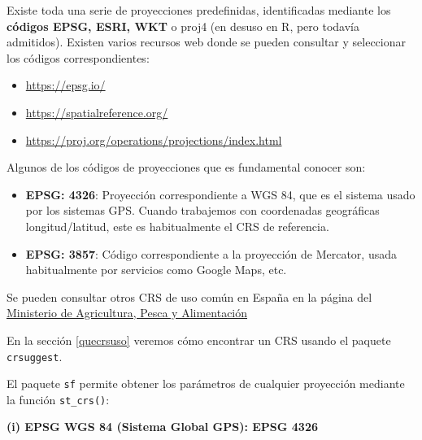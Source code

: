 \documentclass[
]{report}
\begin{document}
Existe toda una serie de proyecciones predefinidas, identificadas mediante los
\textbf{códigos EPSG, ESRI, WKT} o proj4 (en desuso en R, pero todavía admitidos).
Existen varios recursos web donde se pueden consultar y seleccionar los códigos
correspondientes:

\begin{itemize}
\item
  \url{https://epsg.io/}
\item
  \url{https://spatialreference.org/}
\item
  \url{https://proj.org/operations/projections/index.html}
\end{itemize}

Algunos de los códigos de proyecciones que es fundamental conocer son:

\begin{itemize}
\item
  \textbf{EPSG: 4326}: Proyección correspondiente a WGS 84, que es el sistema usado
  por los sistemas GPS. Cuando trabajemos con coordenadas geográficas
  longitud/latitud, este es habitualmente el CRS de referencia.
\item
  \textbf{EPSG: 3857}: Código correspondiente a la proyección de Mercator, usada
  habitualmente por servicios como Google Maps, etc.
\end{itemize}

Se pueden consultar otros CRS de uso común en España en la página del
\href{https://www.mapa.gob.es/es/cartografia-y-sig/ide/directorio_datos_servicios/caracteristicas_wms.aspx}{Ministerio de Agricultura, Pesca y
Alimentación}

En la sección \ref{quecrsuso} veremos cómo encontrar un CRS usando el paquete
\texttt{crsuggest}.

El paquete \texttt{sf} permite obtener los parámetros de cualquier proyección mediante
la función \texttt{st\_crs()}:

\textbf{(i) EPSG WGS 84 (Sistema Global GPS): EPSG 4326}
\end{document}
